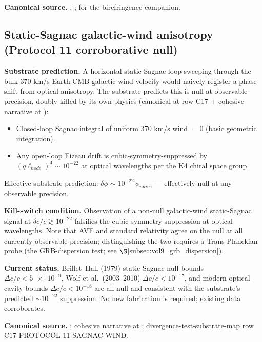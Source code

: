 \textbf{Canonical source.} ; ;  for the birefringence companion.

\subsection{Static-Sagnac galactic-wind anisotropy (Protocol 11 corroborative null)}
\label{subsec:vol9_static_sagnac_null}

\textbf{Substrate prediction.} A horizontal static-Sagnac loop sweeping through the bulk 370 km/s Earth-CMB galactic-wind velocity would naively register a phase shift from optical anisotropy. The substrate predicts this is null at observable precision, doubly killed by its own physics (canonical at  row C17 + cohesive narrative at ):

\begin{itemize}
    \item Closed-loop Sagnac integral of uniform 370 km/s wind $= 0$ (basic geometric integration).
    \item Any open-loop Fizeau drift is cubic-symmetry-suppressed by $(q\ell_{node})^4 \sim 10^{-22}$ at optical wavelengths per the K4 chiral space group.
\end{itemize}

Effective substrate prediction: $\delta\phi \sim 10^{-22}\, \phi_{naive}$ --- effectively null at any observable precision.

\textbf{Kill-switch condition.} Observation of a non-null galactic-wind static-Sagnac signal at $\delta c/c \gtrsim 10^{-22}$ falsifies the cubic-symmetry suppression at optical wavelengths. Note that AVE and standard relativity agree on the null at all currently observable precision; distinguishing the two requires a Trans-Planckian probe (the GRB-dispersion test; see $\S$\ref{subsec:vol9_grb_dispersion}).

\textbf{Current status.} Brillet--Hall (1979) static-Sagnac null bounds $\Delta c/c < \num{5e-9}$, Wolf et al.~(2003--2010) $\Delta c/c < 10^{-17}$, and modern optical-cavity bounds $\Delta c/c < 10^{-18}$ are all null and consistent with the substrate's predicted $\sim 10^{-22}$ suppression. No new fabrication is required; existing data corroborates.

\textbf{Canonical source.} ; cohesive narrative at ; divergence-test-substrate-map row C17-PROTOCOL-11-SAGNAC-WIND.

